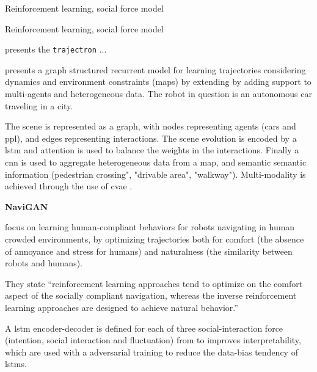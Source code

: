 
\cite{everett2018motion} Reinforcement learning, social force model


\cite{long2018towards} Reinforcement learning, social force model


\cite{ivanovic2019trajectron} presents the \texttt{trajectron} ...


\cite{salzmann2020trajectron++}  presents a graph structured recurrent model for learning trajectories considering dynamics and environment constraints (maps) by extending \cite{ivanovic2019trajectron} by adding support to multi-agents and heterogeneous data. The robot in question is an autonomous car traveling in a city.

The scene is represented as a graph, with nodes representing agents (cars and ppl), and edges representing interactions.
%
The scene evolution is encoded by a \gls{lstm} and attention is used to balance the weights in the interactions.
%
Finally a \gls{cnn} is used to aggregate heterogeneous data from a map, and semantic semantic information (pedestrian crossing", "drivable area", "walkway"). 
%
Multi-modality is achieved through the use of \gls{cvae} .


\textbf{NaviGAN}

\cite{tsai2020generative} focus on learning human-compliant behaviors for robots navigating in human crowded environments, by optimizing trajectories both for comfort (the absence of annoyance and stress for humans) and naturalness (the similarity between robots and humans).

They state ``reinforcement learning approaches tend to optimize on the comfort aspect of the socially compliant navigation, whereas the inverse reinforcement learning approaches are designed to achieve natural behavior.''

A \gls{lstm} encoder-decoder is defined for each of three social-interaction force (intention, social interaction and fluctuation) from \cite{helbing1995social} to improves interpretability, which are used with a adversarial training to reduce the data-bias tendency of \glspl{lstm}.

